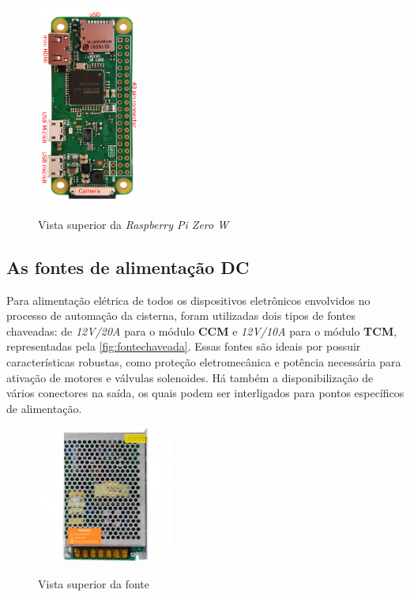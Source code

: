 \begin{figure}[H]
	\centering
	\caption{Vista superior da \textit{Raspberry Pi Zero W}}
	\includegraphics[width=0.3\textwidth, angle = 90]{figuras/rasp_zerow.png}
	\label{fig:rasppizerow}
\end{figure} 

\subsection{As fontes de alimentação DC}

Para alimentação elétrica de todos os dispositivos eletrônicos envolvidos no processo de automação da cisterna, foram utilizadas dois tipos de fontes chaveadas: de \textit{12V/20A} para o módulo \textbf{CCM} e \textit{12V/10A} para o módulo \textbf{TCM}, representadas pela \autoref{fig:fontechaveada}. Essas fontes são ideais por possuir características robustas, como proteção eletromecânica e potência necessária para ativação de motores e válvulas solenoides. Há também a disponibilização de vários conectores na saída, os quais podem ser interligados para pontos específicos de alimentação.

\begin{figure}[H]
	\centering
	\caption{Vista superior da fonte}
	\includegraphics[width=0.4\textwidth]{figuras/fonte_chaveada.jpg}
	\label{fig:fontechaveada}
\end{figure} 

